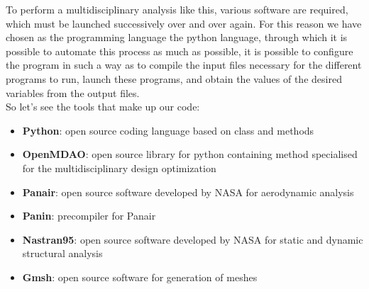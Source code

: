 To perform a multidisciplinary analysis like this, various software are required, which must be launched successively over and over again. For this reason we have chosen as the programming language the python language, through which it is possible to automate this process as much as possible, it is possible to configure the program in such a way as to compile the input files necessary for the different programs to run, launch these programs, and obtain the values of the desired variables from the output files.\\
So let's see the tools that make up our code:
\begin{itemize}
	\item \textbf{Python}: open source coding language based on class and methods
		\item \textbf{OpenMDAO}: open source library for python containing method specialised for the multidisciplinary design optimization
			\item \textbf{Panair}: open source software developed by NASA for aerodynamic analysis
				\item \textbf{Panin}: precompiler for Panair
					\item \textbf{Nastran95}: open source software developed by NASA for static and dynamic structural analysis
						\item \textbf{Gmsh}: open source software for generation of meshes
\end{itemize}


